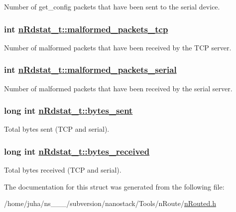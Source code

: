 Number of get\_\-config packets that have been sent to the serial device. \hypertarget{structnRdstat__t_518d1b1a04c73f328e18e8dfec9691a7}{
\subsubsection[malformed\_\-packets\_\-tcp]{\setlength{\rightskip}{0pt plus 5cm}int \hyperlink{structnRdstat__t_518d1b1a04c73f328e18e8dfec9691a7}{n\-Rdstat\_\-t::malformed\_\-packets\_\-tcp}}}
\label{structnRdstat__t_518d1b1a04c73f328e18e8dfec9691a7}


Number of malformed packets that have been received by the TCP server. \hypertarget{structnRdstat__t_ea478ea425e07a7511bb8dc909c049ca}{
\subsubsection[malformed\_\-packets\_\-serial]{\setlength{\rightskip}{0pt plus 5cm}int \hyperlink{structnRdstat__t_ea478ea425e07a7511bb8dc909c049ca}{n\-Rdstat\_\-t::malformed\_\-packets\_\-serial}}}
\label{structnRdstat__t_ea478ea425e07a7511bb8dc909c049ca}


Number of malformed packets that have been received by the serial server. \hypertarget{structnRdstat__t_1b3082b4f7c51e187c43ef4964cf5bb3}{
\subsubsection[bytes\_\-sent]{\setlength{\rightskip}{0pt plus 5cm}long int \hyperlink{structnRdstat__t_1b3082b4f7c51e187c43ef4964cf5bb3}{n\-Rdstat\_\-t::bytes\_\-sent}}}
\label{structnRdstat__t_1b3082b4f7c51e187c43ef4964cf5bb3}


Total bytes sent (TCP and serial). \hypertarget{structnRdstat__t_2b421bcc473a30ddf8044bd26482e07d}{
\subsubsection[bytes\_\-received]{\setlength{\rightskip}{0pt plus 5cm}long int \hyperlink{structnRdstat__t_2b421bcc473a30ddf8044bd26482e07d}{n\-Rdstat\_\-t::bytes\_\-received}}}
\label{structnRdstat__t_2b421bcc473a30ddf8044bd26482e07d}


Total bytes received (TCP and serial). 

The documentation for this struct was generated from the following file:\begin{CompactItemize}
\item 
/home/juha/ns\_\_\_/subversion/nanostack/Tools/n\-Route/\hyperlink{nRouted_8h}{n\-Routed.h}\end{CompactItemize}
